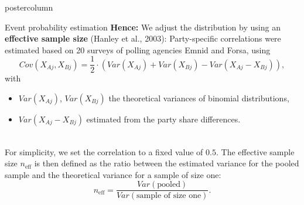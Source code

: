 \documentclass[final,hyperref={pdfpagelabels=false}]{beamer}
\let\olditem\item
\renewcommand\item{\justifying\olditem} %
\newcommand{\bfBlue}[1]{\textcolor{koaladarkestblue}{\textbf{#1}}}
\newcommand{\goodgreen}[1]{\textcolor{goodgreen}{#1}}
\newcommand*\circled[1]{\tikz[baseline=(char.base)]{
\node[shape=circle,draw,inner sep=2pt] (char) {#1};}}
\begin{document}
\begin{frame}
\begin{columns}
\begin{column}{1\textwidth}
\begin{columns}[T]
\begin{column}{.484\textwidth}
\begin{beamercolorbox}[center,wd=\textwidth]{postercolumn}
\begin{minipage}[T]{.95\textwidth}
\begin{block}{\footnotesize \circled{1} Event probability estimation}
\textbf{\goodgreen{Hence:}} We adjust the
distribution by using an \bfBlue{effective sample size} {\footnotesize (Hanley et al., 2003)}:
Party-specific correlations were estimated based on
20 surveys of polling agencies Emnid and Forsa, using
$$
Cov(X_{Aj}, X_{Bj}) = \frac{1}{2} \cdot \left(Var(X_{Aj}) + Var(X_{Bj}) - Var(X_{Aj} - X_{Bj}) \right),
$$
with
\begin{minipage}{\textwidth}
\hspace{0.5in}
\begin{itemize}
  \item $Var(X_{Aj})$, $Var(X_{Bj})$ the theoretical variances of binomial distributions,
  \item $Var(X_{Aj} - X_{Bj})$ estimated from the party share differences.
\end{itemize}
\end{minipage}
\\[0.8cm]
For simplicity, we set the correlation to a fixed value of $0.5$.
The effective sample size $n_{\text{eff}}$ is then defined as the ratio between
the estimated variance for the pooled sample and the theoretical variance for a
sample of size one:
$$
n_{\text{eff}} = \frac{Var(\text{pooled})}{Var(\text{sample of size one})}.
$$


\end{block}
\end{minipage}
\end{beamercolorbox}
\end{column}
\end{columns}
\end{column}
\end{columns}
\end{frame}
\end{document}
